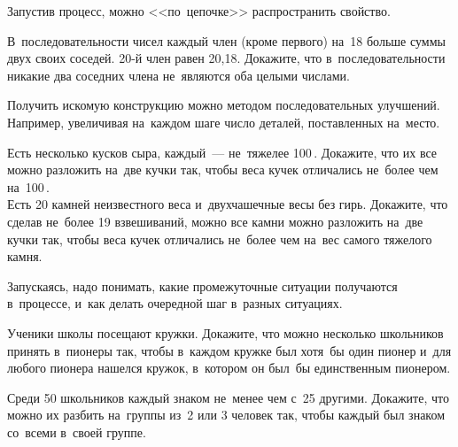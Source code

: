 



Запустив процесс, можно <<по~цепочке>> распространить свойство.

\begin{exercises}

\item
В~последовательности чисел каждый член (кроме первого) на~18 больше суммы
двух своих соседей.
20-й член равен 20{,}18.
Докажите, что в~последовательности никакие два соседних члена не~являются оба
целыми числами.

\end{exercises}

Получить искомую конструкцию можно методом последовательных улучшений.
Например, увеличивая на~каждом шаге число деталей, поставленных на~место.

\begin{exercises}

\item
\subproblem
Есть несколько кусков сыра, каждый~--- не~тяжелее 100\,.
Докажите, что их все можно разложить на~две кучки так, чтобы веса кучек
отличались не~более чем на~100\,.
\\
\subproblem
Есть 20 камней неизвестного веса и~двухчашечные весы без гирь.
Докажите, что сделав не~более 19 взвешиваний, можно все камни можно разложить
на~две кучки так, чтобы веса кучек отличались не~более чем на~вес самого
тяжелого камня.

\end{exercises}

Запускаясь, надо понимать, какие промежуточные ситуации получаются в~процессе,
и~как делать очередной шаг в~разных ситуациях.

\begin{exercises}

\item
Ученики школы посещают кружки.
Докажите, что можно несколько школьников принять в~пионеры так, чтобы в~каждом
кружке был хотя~бы один пионер и~для любого пионера нашелся кружок, в~котором
он был~бы единственным пионером.

\item
Среди 50 школьников каждый знаком не~менее чем с~25 другими.
Докажите, что можно их разбить на~группы из~2 или 3 человек так, чтобы каждый
был знаком со~всеми в~своей группе.

\end{exercises}

